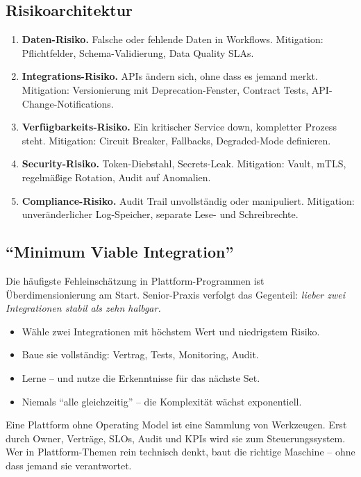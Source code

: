 \documentclass[11pt,a4paper,oneside]{article}
\begin{document}
\subsection{Risikoarchitektur}

\begin{enumerate}
  \item \textbf{Daten-Risiko.} Falsche oder fehlende Daten in Workflows. Mitigation: Pflichtfelder, Schema-Validierung, Data Quality SLAs.
  \item \textbf{Integrations-Risiko.} APIs ändern sich, ohne dass es jemand merkt. Mitigation: Versionierung mit Deprecation-Fenster, Contract Tests, API-Change-Notifications.
  \item \textbf{Verfügbarkeits-Risiko.} Ein kritischer Service down, kompletter Prozess steht. Mitigation: Circuit Breaker, Fallbacks, Degraded-Mode definieren.
  \item \textbf{Security-Risiko.} Token-Diebstahl, Secrets-Leak. Mitigation: Vault, mTLS, regelmäßige Rotation, Audit auf Anomalien.
  \item \textbf{Compliance-Risiko.} Audit Trail unvollständig oder manipuliert. Mitigation: unveränderlicher Log-Speicher, separate Lese- und Schreibrechte.
\end{enumerate}

\subsection{``Minimum Viable Integration''}

Die häufigste Fehleinschätzung in Plattform-Programmen ist Überdimensionierung am Start. Senior-Praxis verfolgt das Gegenteil: \emph{lieber zwei Integrationen stabil als zehn halbgar.}

\begin{itemize}
  \item Wähle zwei Integrationen mit höchstem Wert und niedrigstem Risiko.
  \item Baue sie vollständig: Vertrag, Tests, Monitoring, Audit.
  \item Lerne -- und nutze die Erkenntnisse für das nächste Set.
  \item Niemals ``alle gleichzeitig'' -- die Komplexität wächst exponentiell.
\end{itemize}

\begin{merkbox}
Eine Plattform ohne Operating Model ist eine Sammlung von Werkzeugen. Erst durch Owner, Verträge, SLOs, Audit und KPIs wird sie zum Steuerungssystem. Wer in Plattform-Themen rein technisch denkt, baut die richtige Maschine -- ohne dass jemand sie verantwortet.
\end{merkbox}
\end{document}
